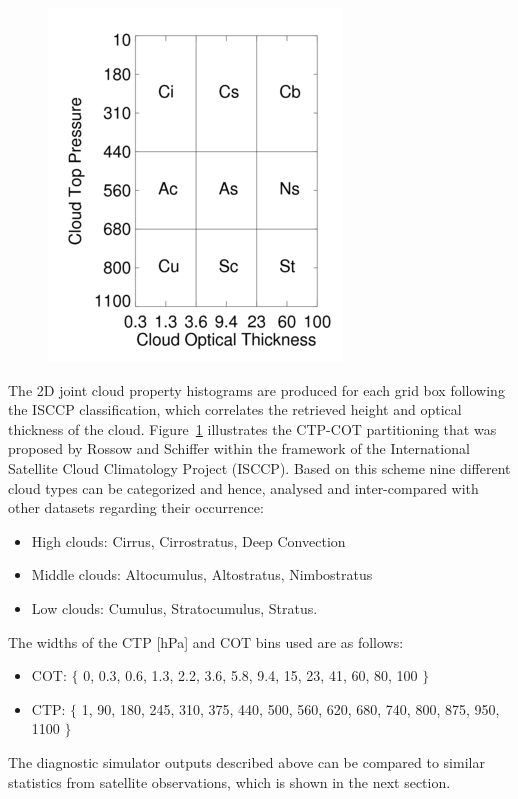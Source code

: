 \begin{figure}[!ht]
  \begin{minipage}[c]{0.5\textwidth}
    \includegraphics[scale=0.55]{./figures/isccp_uebersicht.png} 
  \end{minipage}\hfill
  \begin{minipage}[c]{0.5\textwidth}
    \caption[ISCCP COT-CTP classification.]{\isccp}\label{fig:isccp}
  \end{minipage}
\end{figure}


The 2D joint cloud property histograms are produced for each grid box following 
the ISCCP classification, which correlates the retrieved height and optical thickness of the cloud. 
Figure~\ref{fig:isccp} illustrates the CTP-COT partitioning that was proposed 
by Rossow and Schiffer \cite{Rossow1999} within the framework of the 
International Satellite Cloud Climatology Project (ISCCP).
Based on this scheme nine different cloud types can be categorized and hence,
analysed and inter-compared with other datasets regarding their occurrence:
\begin{itemize}\setlength\itemsep{0.2em}
 \item High clouds: Cirrus, Cirrostratus, Deep Convection
 \item Middle clouds: Altocumulus, Altostratus, Nimbostratus
 \item Low clouds: Cumulus, Stratocumulus, Stratus.
\end{itemize}
The widths of the CTP [hPa] and COT bins used are as follows:
\begin{itemize}\setlength\itemsep{0.2em}
 \item COT: $\{$ 0, 0.3, 0.6, 1.3, 2.2, 3.6, 5.8, 9.4, 15, 23, 41, 60, 80, 100 $\}$
 \item CTP: $\{$ 1, 90, 180, 245, 310, 375, 440, 500, 560, 620, 680, 740, 800, 875, 950, 1100 $\}$
\end{itemize}

The diagnostic simulator outputs described above can be compared to similar statistics 
from satellite  observations, which is shown in the next section.




